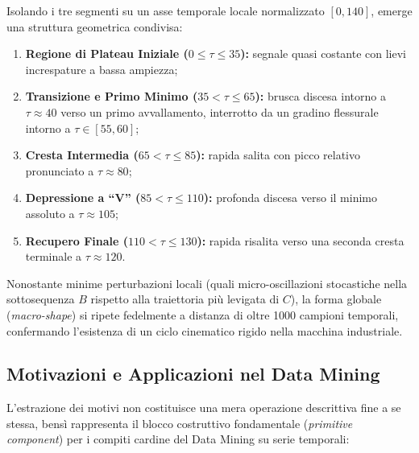 Isolando i tre segmenti su un asse temporale locale normalizzato $[0, 140]$, emerge una struttura geometrica condivisa:
\begin{enumerate}
    \item \textbf{Regione di Plateau Iniziale ($0 \le \tau \le 35$):} segnale quasi costante con lievi increspature a bassa ampiezza;
    \item \textbf{Transizione e Primo Minimo ($35 < \tau \le 65$):} brusca discesa intorno a $\tau \approx 40$ verso un primo avvallamento, interrotto da un gradino flessurale intorno a $\tau \in [55, 60]$;
    \item \textbf{Cresta Intermedia ($65 < \tau \le 85$):} rapida salita con picco relativo pronunciato a $\tau \approx 80$;
    \item \textbf{Depressione a ``V'' ($85 < \tau \le 110$):} profonda discesa verso il minimo assoluto a $\tau \approx 105$;
    \item \textbf{Recupero Finale ($110 < \tau \le 130$):} rapida risalita verso una seconda cresta terminale a $\tau \approx 120$.
\end{enumerate}

Nonostante minime perturbazioni locali (quali micro-oscillazioni stocastiche nella sottosequenza $B$ rispetto alla traiettoria pi\`u levigata di $C$), la forma globale (\textit{macro-shape}) si ripete fedelmente a distanza di oltre 1000 campioni temporali, confermando l'esistenza di un ciclo cinematico rigido nella macchina industriale.

\FloatBarrier
\subsection{Motivazioni e Applicazioni nel Data Mining}
\label{subsec:ts-motif-applications}

L'estrazione dei motivi non costituisce una mera operazione descrittiva fine a se stessa, bens\`i rappresenta il blocco costruttivo fondamentale (\textit{primitive component}) per i compiti cardine del Data Mining su serie temporali:


